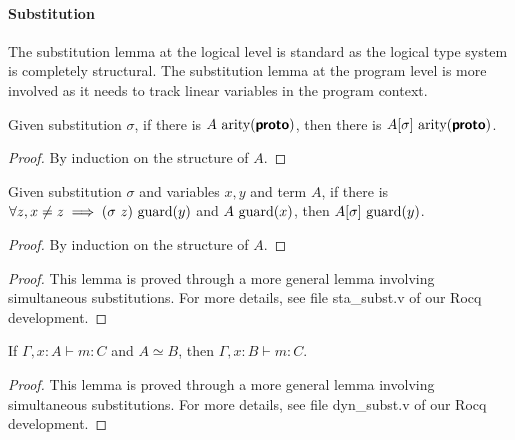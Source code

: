 \paragraph{\textbf{Substitution}}
The substitution lemma at the logical level is standard as the logical type system is
completely structural. The substitution lemma at the program level is more involved
as it needs to track linear variables in the program context.

\begin{lemma}
  Given substitution $\sigma$, if there is $A~\text{arity}(\textbf{\textsf{proto}})$, then there is $A[\sigma]~\text{arity}(\textbf{\textsf{proto}})$.
\end{lemma}
\begin{proof}
  By induction on the structure of $A$.
\end{proof}

\begin{lemma}
  Given substitution $\sigma$ and variables $x, y$ and term $A$,
  if there is $\forall z, x \neq z \implies (\sigma\ z)~\text{guard}(y)$
  and $A~\text{guard}(x)$, then $A[\sigma]~\text{guard}(y)$.
\end{lemma}
\begin{proof}
  By induction on the structure of $A$.
\end{proof}

\begin{proof}
  This lemma is proved through a more general lemma involving simultaneous substitutions. 
  For more details, see file \textsf{sta\_subst.v} of our Rocq development.
\end{proof}

\begin{corollary}
  If $\Gamma, x : A \vdash m : C$ and $A \simeq B$, then $\Gamma, x : B \vdash m : C$.
\end{corollary}

\begin{proof}
  This lemma is proved through a more general lemma involving simultaneous substitutions. 
  For more details, see file \textsf{dyn\_subst.v} of our Rocq development.
\end{proof}

